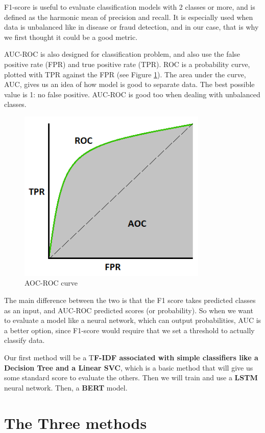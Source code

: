 \documentclass[11pt]{scrartcl}
\begin{document}
F1-score is useful to evaluate classification models with 2 classes or more, and is defined as the harmonic mean of precision and recall. It is especially used when data is unbalanced like in disease or fraud detection, and in our case, that is why we first thought it could be a good metric.

AUC-ROC is also designed for classification problem, and also use the false positive rate (FPR) and true positive rate (TPR). ROC is a probability curve, plotted with TPR against the FPR (see Figure \ref{fig:aoc}). The area under the curve, AUC, gives us an idea of how model is good to separate data. The best possible value is 1: no false positive. AUC-ROC is good too when dealing with unbalanced classes.


\begin{figure}[h]
    \centering
    \includegraphics[width=9cm]{img/auc.png}
    \caption{AOC-ROC curve \cite{narkhede_2018}}
    \label{fig:aoc}
\end{figure}


The main difference between the two is that the F1 score takes predicted classes as an input, and AUC-ROC predicted scores (or probability). So when we want to evaluate a model like a neural network, which can output probabilities, AUC is a better option, since F1-score would require that we set a threshold to actually classify data.

Our first method will be a T\textbf{F-IDF associated with simple classifiers like a Decision Tree and a Linear SVC}, which is a basic method that will give us some standard score to evaluate the others. Then we will train and use a \textbf{LSTM} neural network. Then, a \textbf{BERT} model.

\section{The Three methods}
\end{document}
